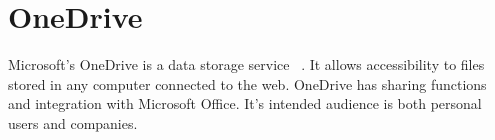 \section{OneDrive}

Microsoft's OneDrive is a data storage service 
~\cite{www-hid-sp18-601-odrive-website}. It allows accessibility  to files
 stored in any computer connected to the web. OneDrive has sharing functions and
 integration with Microsoft Office. It's intended audience is both personal 
users and companies.